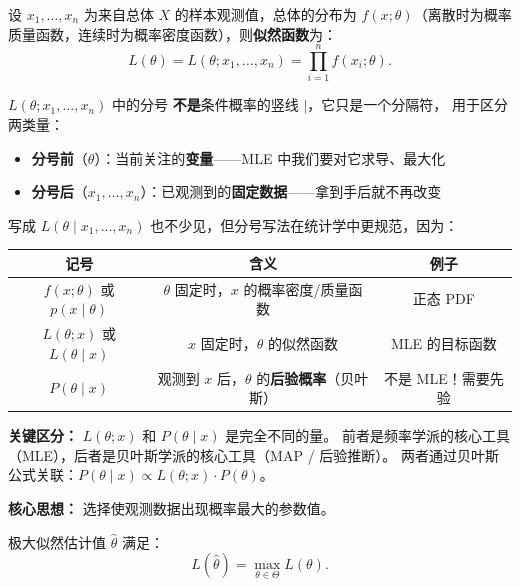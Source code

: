 \begin{definition}[似然函数]
设 $x_1, \dots, x_n$ 为来自总体 $X$ 的样本观测值，总体的分布为 $f(x; \theta)$（离散时为概率质量函数，连续时为概率密度函数），则\textbf{似然函数}为：
\begin{equation}
    L(\theta) = L(\theta; x_1, \dots, x_n) = \prod_{i=1}^{n} f(x_i; \theta).
\end{equation}
\end{definition}

\begin{remark}
$L(\theta; x_1, \dots, x_n)$ 中的分号 \textbf{不是}条件概率的竖线 $|$，它只是一个分隔符，
用于区分两类量：

\begin{itemize}
    \item \textbf{分号前}（$\theta$）：当前关注的\textbf{变量}——MLE 中我们要对它求导、最大化
    \item \textbf{分号后}（$x_1,\dots,x_n$）：已观测到的\textbf{固定数据}——拿到手后就不再改变
\end{itemize}

写成 $L(\theta \mid x_1,\dots,x_n)$ 也不少见，但分号写法在统计学中更规范，因为：

\begin{center}
\renewcommand{\arraystretch}{1.3}
\begin{tabular}{c|c|c}
\toprule
\textbf{记号} & \textbf{含义} & \textbf{例子} \\
\midrule
$f(x; \theta)$ 或 $p(x \mid \theta)$ & $\theta$ 固定时，$x$ 的概率密度/质量函数 & 正态 PDF \\
$L(\theta; x)$ 或 $L(\theta \mid x)$ & $x$ 固定时，$\theta$ 的似然函数 & MLE 的目标函数 \\
$P(\theta \mid x)$ & 观测到 $x$ 后，$\theta$ 的\textbf{后验概率}（贝叶斯） & 不是 MLE！需要先验 \\
\bottomrule
\end{tabular}
\end{center}

\textbf{关键区分：} $L(\theta; x)$ 和 $P(\theta \mid x)$ 是完全不同的量。
前者是频率学派的核心工具（MLE），后者是贝叶斯学派的核心工具（MAP / 后验推断）。
两者通过贝叶斯公式关联：$P(\theta \mid x) \propto L(\theta; x) \cdot P(\theta)$。
\end{remark}

\textbf{核心思想：} 选择使观测数据出现概率最大的参数值。

极大似然估计值 $\hat{\theta}$ 满足：
\begin{equation}
    L(\hat{\theta}) = \max_{\theta \in \Theta} L(\theta).
\end{equation}

